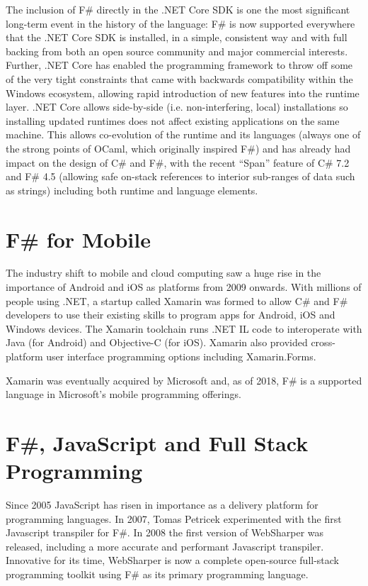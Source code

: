 \documentclass[acmsmall,screen]{acmart}
\begin{document}
The inclusion of F\# directly in the .NET Core SDK is one the most significant long-term event in the history of the
language: F\# is now supported everywhere that the .NET Core SDK is installed, in a simple, consistent way and with full
backing from both an open source community and major commercial interests. Further, .NET Core has enabled the programming
framework to throw off some of the very tight constraints that came with backwards compatibility within the Windows
ecosystem, allowing rapid introduction of new features into the runtime layer. .NET Core allows side-by-side (i.e. non-interfering,
local) installations so installing updated runtimes does not affect existing applications on the same machine. This allows co-evolution
of the runtime and its languages (always one of the strong points of OCaml, which originally inspired F\#) and has already had
impact on the design of C\# and F\#, with the recent “Span” feature of C\# 7.2 and F\# 4.5 (allowing safe on-stack references
to interior sub-ranges of data such as strings) including both runtime and language elements.

\section*{F\# for Mobile}


The industry shift to mobile and cloud computing saw a huge rise in the importance of Android and iOS as platforms from 2009
onwards.  With millions of people using .NET, a startup called Xamarin was formed to allow C\# and F\# developers to use their
existing skills to program apps for Android, iOS and Windows devices.  The Xamarin toolchain runs .NET IL code to interoperate
with Java (for Android) and Objective-C (for iOS).  Xamarin also provided cross-platform user interface programming options including Xamarin.Forms. 

Xamarin was eventually acquired by Microsoft and, as of 2018, F\# is a supported language in Microsoft’s mobile programming offerings.


\section*{F\#, JavaScript and Full Stack Programming}

Since 2005 JavaScript has risen in importance as a delivery platform for programming languages. In 2007, Tomas Petricek
experimented with the first Javascript transpiler for F\#. In 2008 the first version of WebSharper was released, including
a more accurate and performant Javascript transpiler.  Innovative for its time, WebSharper is now a complete
open-source full-stack programming toolkit using F\# as its primary programming language.
\end{document}
